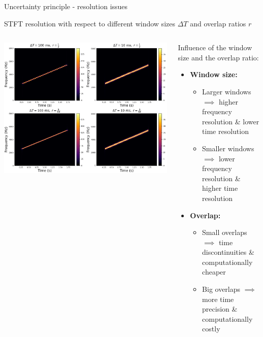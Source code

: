 \documentclass[10pt,american,ignorenonframetext,aspectratio=1610]{beamer}
\providecommand{\tightlist}{%
  \setlength{\itemsep}{0pt}\setlength{\parskip}{0pt}}
\theoremstyle{remark}
\begin{document}
\begin{frame}{Uncertainty principle - resolution issues}
\protect\hypertarget{uncertainty-principle---resolution-issues}{}

STFT resolution with respect to different window sizes \(\Delta T\) and
overlap ratios \(r\)

\begin{columns}[T]
\begin{column}{0.6\textwidth}
\includegraphics[width=\textwidth,height=0.8\textheight]{img/stft_resolution.png}
\end{column}

\begin{column}{0.4\textwidth}
Influence of the window size and the overlap ratio:

\begin{itemize}
\tightlist
\item
  \textbf{Window size:}

  \begin{itemize}
  \tightlist
  \item
    Larger windows \(\implies\) higher frequency resolution \& lower
    time resolution
  \item
    Smaller windows \(\implies\) lower frequency resolution \& higher
    time resolution
  \end{itemize}
\item
  \textbf{Overlap:}

  \begin{itemize}
  \tightlist
  \item
    Small overlaps \(\implies\) time discontinuities \& computationally
    cheaper
  \item
    Big overlaps \(\implies\) more time precision \& computationally
    costly
  \end{itemize}
\end{itemize}
\end{column}
\end{columns}

\end{frame}
\end{document}
